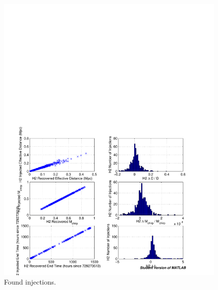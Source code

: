 \begin{figure}[p]
\begin{center}
\includegraphics[width=\textwidth]{analysis/figures/h2_param_error}
\end{center}
\caption{\label{f:pipeline}%
Found injections.
}
\end{figure}

